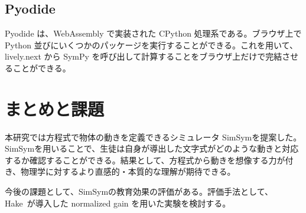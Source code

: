 \documentclass[11pt, a4paper, oneside, twocolumn, dvipdfmx]{jsarticle}
\newcommand{\simname}{SimSym}
\begin{document}
\subsection{Pyodide}
Pyodide は、WebAssembly で実装された CPython 処理系である。ブラウザ上で Python 並びにいくつかのパッケージを実行することができる。これを用いて、lively.next から SymPy を呼び出して計算することをブラウザ上だけで完結させることができる。

\section{まとめと課題}
本研究では方程式で物体の動きを定義できるシミュレータ \simname を提案した。\simname を用いることで、生徒は自身が導出した文字式がどのような動きと対応するか確認することができる。結果として、方程式から動きを想像する力が付き、物理学に対するより直感的・本質的な理解が期待できる。

今後の課題として、\simname の教育効果の評価がある。評価手法として、Hake~\cite{hake_1998}が導入した normalized gain を用いた実験を検討する。



\end{document}
